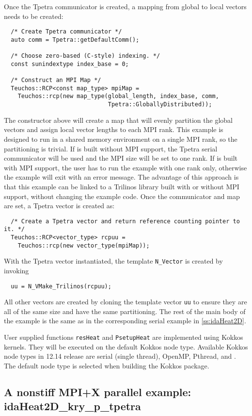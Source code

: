 Once the Tpetra communicator is created, a mapping from global to local vectors
needs to be created:
\begin{verbatim}
  /* Create Tpetra communicator */
  auto comm = Tpetra::getDefaultComm();

  /* Choose zero-based (C-style) indexing. */
  const sunindextype index_base = 0;

  /* Construct an MPI Map */
  Teuchos::RCP<const map_type> mpiMap =
    Teuchos::rcp(new map_type(global_length, index_base, comm,
                              Tpetra::GloballyDistributed));
\end{verbatim}
The constructor above will create a map that will evenly partition the global vectors
and assign local vector lengths to each MPI rank. This example is designed to
run in a shared memory environment on a single MPI rank, so the partitioning is trivial.
If {\trilinos} is built without MPI support, the Tpetra serial
communicator will be used and the MPI size will be set to one rank. If {\trilinos} is built
with MPI support, the user has to run the example with one rank only, otherwise the example
will exit with an error message. The advantage of this approach is that
this example can be linked to a Trilinos library built with or without MPI support, without
changing the example code. 
Once the communicator and map are set, a Tpetra vector is created as:
\begin{verbatim}
  /* Create a Tpetra vector and return reference counting pointer to it. */
  Teuchos::RCP<vector_type> rcpuu =
    Teuchos::rcp(new vector_type(mpiMap));
\end{verbatim}
With the Tpetra vector instantiated, the template \verb|N_Vector| is created by 
invoking
\begin{verbatim}
  uu = N_VMake_Trilinos(rcpuu);
\end{verbatim}
All other vectors are created by cloning the template vector \verb|uu| to
ensure they are all of the same size and have the same partitioning. The
rest of the main body of the example is the same as in the corresponding
serial example in \ref{ss:idaHeat2D}.

User supplied functions \verb|resHeat| and \verb|PsetupHeat| are implemented
using Kokkos kernels. They will be executed on the default Kokkos node type.
Available Kokkos node types in {\trilinos} 12.14 release are serial (single thread),
OpenMP, Pthread, and {\cuda}. The default node type is selected when building
the Kokkos package.


\subsection{A nonstiff MPI+X parallel example: idaHeat2D\_kry\_p\_tpetra}
\label{ss:idaHeat2D_kry_p_tpetra}

